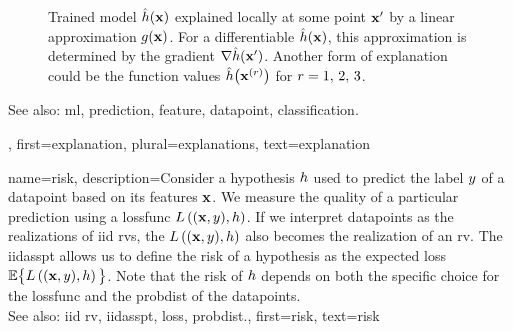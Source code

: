 {{\begin{figure}[H]
\begin{center}
	 	\end{center}
	 	\caption{Trained \gls{model} $\hat{h}({\bf x})$ explained 
	     		locally at some point ${\bf x}'$ by a linear approximation $g({\bf x})$. 
	     		For a \gls{differentiable} $\hat{h}({\bf x})$, this approximation is 
	     		determined by the \gls{gradient} $\nabla \hat{h}({\bf x}')$. Another 
	     		form of explanation could be the \gls{function} values $\hat{h}\big({\bf x}^{(r)} \big)$ 
	     		for $r=1, \,2, \,3$. 
			\label{fig_explanation_dict}}
	 	\end{figure} 
		See also: \gls{ml}, \gls{prediction}, \gls{feature}, \gls{datapoint}, \gls{classification}.},
	first={explanation},
	plural={explanations},
	text={explanation} 
}

{name={risk},
	description={Consider a \gls{hypothesis} $h$ used to predict the \gls{label} 
		$y$ of a \gls{datapoint} based on its \glspl{feature} ${\bf x}$. We measure 
		the quality of a particular \gls{prediction} using a \gls{lossfunc} $L\left(({\bf x},y),h \right)$. 
		If we interpret \glspl{datapoint} as the \glspl{realization} of \gls{iid} \glspl{rv}, 
		the $L\left(({\bf x},y),h \right)$ also becomes the \gls{realization} 
		of an \gls{rv}. The \gls{iidasspt} allows us to define the risk of a \gls{hypothesis} 
		as the expected \gls{loss} $\mathbb{E} \big\{L\left(({\bf x},y),h \right) \big\}$. 
		Note that the risk of $h$ depends on both the specific choice for the \gls{lossfunc} and the 
		\gls{probdist} of the \glspl{datapoint}.
					\\ 
		See also: \gls{iid} \gls{rv}, \gls{iidasspt}, \gls{loss}, \gls{probdist}.},
	first={risk},
	text={risk} 
}

